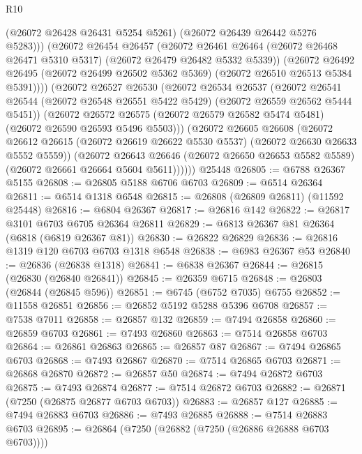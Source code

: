 \begin{lexlean}{R10}
\begin{coremodule}
              (@26072 @26428 @26431 @5254 @5261)
              (@26072 @26439 @26442 @5276 @5283)))
          (@26072
            @26454
            @26457
            (@26072
              @26461
              @26464
              (@26072 @26468 @26471 @5310 @5317)
              (@26072 @26479 @26482 @5332 @5339))
            (@26072
              @26492
              @26495
              (@26072 @26499 @26502 @5362 @5369)
              (@26072 @26510 @26513 @5384 @5391))))
        (@26072
          @26527
          @26530
          (@26072
            @26534
            @26537
            (@26072
              @26541
              @26544
              (@26072 @26548 @26551 @5422 @5429)
              (@26072 @26559 @26562 @5444 @5451))
            (@26072
              @26572
              @26575
              (@26072 @26579 @26582 @5474 @5481)
              (@26072 @26590 @26593 @5496 @5503)))
          (@26072
            @26605
            @26608
            (@26072
              @26612
              @26615
              (@26072 @26619 @26622 @5530 @5537)
              (@26072 @26630 @26633 @5552 @5559))
            (@26072
              @26643
              @26646
              (@26072 @26650 @26653 @5582 @5589)
              (@26072 @26661 @26664 @5604 @5611))))))
    @25448
@26805 := @6788 @26367 @5155
@26808 := @26805 @5188 @6706 @6703
@26809 := @6514 @26364
@26811 := @6514 @1318 @6548
@26815 := @26808 (@26809 @26811) (@11592 @25448)
@26816 := @6804 @26367
@26817 := @26816 @142
@26822 := @26817 @3101 @6703 @6705 @26364 @26811
@26829 := @6813 @26367 @81 @26364 (@6818 (@6819 @26367 @81))
@26830 := @26822 @26829
@26836 := @26816 @1319 @120 @6703 @6703 @1318 @6548
@26838 := @6983 @26367 @53
@26840 := @26836 (@26838 @1318)
@26841 := @6838 @26367
@26844 := @26815 (@26830 (@26840 @26841))
@26845 := @26359 @6715
@26848 := @26803 (@26844 (@26845 @596))
@26851 := @6745 (@6752 @7035) @6755
@26852 := @11558 @26851
@26856 := @26852 @5192 @5288 @5396 @6708
@26857 := @7538 @7011
@26858 := @26857 @132
@26859 := @7494 @26858
@26860 := @26859 @6703
@26861 := @7493 @26860
@26863 := @7514 @26858 @6703
@26864 := @26861 @26863
@26865 := @26857 @87
@26867 := @7494 @26865 @6703
@26868 := @7493 @26867
@26870 := @7514 @26865 @6703
@26871 := @26868 @26870
@26872 := @26857 @50
@26874 := @7494 @26872 @6703
@26875 := @7493 @26874
@26877 := @7514 @26872 @6703
@26882 := @26871 (@7250 (@26875 @26877 @6703 @6703))
@26883 := @26857 @127
@26885 := @7494 @26883 @6703
@26886 := @7493 @26885
@26888 := @7514 @26883 @6703
@26895 := @26864 (@7250 (@26882 (@7250 (@26886 @26888 @6703 @6703))))

\end{coremodule}
\end{lexlean}
